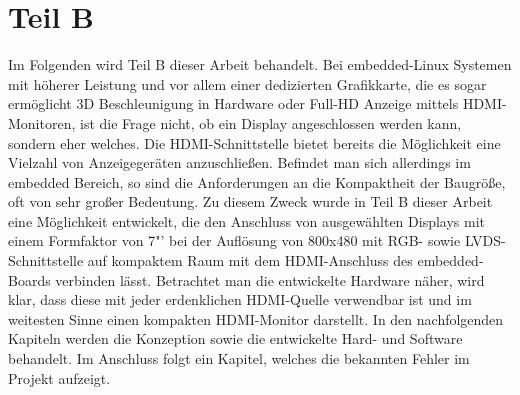 \chapter{Teil B}
\label{cha:TeilB}
Im Folgenden wird Teil B dieser Arbeit behandelt. Bei embedded-Linux Systemen mit höherer Leistung und vor allem einer dedizierten Grafikkarte, die es sogar ermöglicht 3D Beschleunigung in Hardware oder Full-HD Anzeige mittels HDMI-Monitoren, ist die Frage nicht, ob ein Display angeschlossen werden kann, sondern eher welches. Die HDMI-Schnittstelle bietet bereits die Möglichkeit eine Vielzahl von Anzeigegeräten anzuschließen. Befindet man sich allerdings im embedded Bereich, so sind die Anforderungen an die Kompaktheit der Baugröße, oft von sehr großer Bedeutung. Zu diesem Zweck wurde in Teil B dieser Arbeit eine Möglichkeit entwickelt, die den Anschluss von ausgewählten Displays mit einem Formfaktor von 7"' bei der Auflösung von 800x480 mit RGB- sowie LVDS-Schnittstelle auf kompaktem Raum mit dem HDMI-Anschluss des embedded-Boards verbinden lässt. Betrachtet man die entwickelte Hardware näher, wird klar, dass diese mit jeder erdenklichen HDMI-Quelle verwendbar ist und im weitesten Sinne einen kompakten HDMI-Monitor darstellt.
In den nachfolgenden Kapiteln werden die Konzeption sowie die entwickelte Hard- und Software behandelt. Im Anschluss folgt ein Kapitel, welches die bekannten Fehler im Projekt aufzeigt.\newpage





